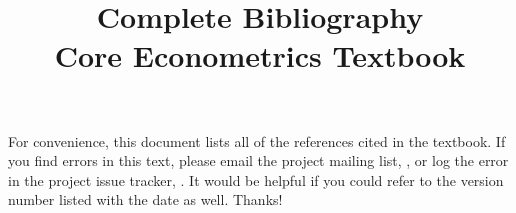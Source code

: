 \documentclass[nohyper]{external/tufte-handout}
\title[Complete bibliography]%
{Complete Bibliography \\
  Core Econometrics Textbook}
\begin{document}
\maketitle

For convenience, this document lists all of the references cited in
the textbook.  If you find errors in this text, please email the
project mailing list, \maillist, or log the error in the project issue
tracker, \bugtrack.  It would be helpful if you could refer to the
version number listed with the date as well.  Thanks!

\nocite{*}


\end{document}
